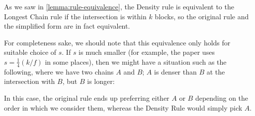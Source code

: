 As we saw in \cref{lemma:rule-equivalence}, the Density rule is equivalent
to the Longest Chain rule if the intersection is within $k$ blocks, so the
original rule and the simplified form are in fact equivalent.

For completeness sake, we should note that this equivalence only holds for
suitable choice of $s$. If $s$ is much smaller (for example, the paper uses $s =
\frac{1}{4}(k/f)$ in some places), then we might have a situation such as the
following, where we have two chains $A$ and $B$; $A$ is denser than $B$ at the
intersection with $B$, but $B$ is longer:
%
\begin{center}
\end{center}
%
In this case, the original rule ends up preferring either $A$ or $B$ depending
on the order in which we consider them, whereas the Density Rule would simply
pick $A$.

